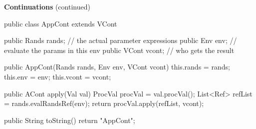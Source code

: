 \begin{minipage}[t]{\sw}
\slidenumber
\LARGE
{\bf Continuations} (continued)
\large
\begin{qv}
public class AppCont extends VCont {

    public Rands rands; // the actual parameter expressions
    public Env env;     // evaluate the params in this env
    public VCont vcont; // who gets the result

    public AppCont(Rands rands, Env env, VCont vcont) {
        this.rands = rands;
        this.env = env;
        this.vcont = vcont;
    }

    public ACont apply(Val val) {
        ProcVal procVal = val.procVal();
        List<Ref> refList = rands.evalRandsRef(env);
        return procVal.apply(refList, vcont);
    }

    public String toString() {
        return "AppCont";
    }

}
\end{qv}
\end{minipage}
